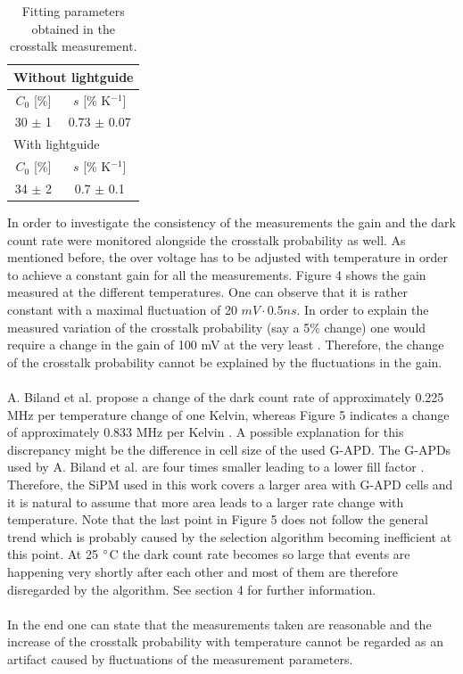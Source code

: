 \documentclass[10pt,a4paper]{article}
\begin{document}
\begin{table}[H]
\centering
\caption{Fitting parameters obtained in the crosstalk measurement.}
\begin{tabular}{|c|c|}
\hline 
 \multicolumn{2}{|l|}{Without lightguide} \\ 
\hline 
$C_0$ [\%] & $s$ [\% K$^{-1}$] \\ 
\hline 
30 $\pm$ 1 & 0.73 $\pm$ 0.07 \\ 
\hline 
 \multicolumn{2}{|l|}{With lightguide} \\ 
\hline 
$C_0$ [\%] & $s$ [\% K$^{-1}$] \\ 
\hline 
34 $\pm$ 2 & 0.7 $\pm$ 0.1 \\ 
\hline 
\end{tabular} 
\label{Table 4}
\end{table}
\begin{multicols}{2} \noindent
In order to investigate the consistency of the measurements the gain and the dark count rate were monitored alongside the crosstalk probability as well. As mentioned before, the over voltage has to be adjusted with temperature in order to achieve a constant gain for all the measurements. Figure 4 shows the gain measured at the different temperatures. One can observe that it is rather constant with a maximal fluctuation of 20 $mV \cdot 0.5ns$. In order to explain the measured variation of the crosstalk probability (say a 5\% change) one would require a change in the gain of 100 mV at the very least \cite{hamaref}. Therefore, the change of the crosstalk probability cannot be explained by the fluctuations in the gain. \\ \\ \noindent
A. Biland et al. propose a change of the dark count rate of approximately 0.225 MHz per temperature change of one Kelvin, whereas Figure 5 indicates a change of approximately 0.833 MHz per Kelvin \cite{gapd}. A possible explanation for this discrepancy might be the difference in cell size of the used G-APD. The G-APDs used by A. Biland et al. are four times smaller leading to a lower fill factor \cite{diode}. Therefore, the SiPM used in this work covers a larger area with G-APD cells and it is natural to assume that more area leads to a larger rate change with temperature. Note that the last point in Figure 5 does not follow the general trend which is probably caused by the selection algorithm becoming inefficient at this point. At 25 $\degree$C the dark count rate becomes so large that events are happening very shortly after each other and most of them are therefore disregarded by the algorithm. See section 4 for further information. \\ \\ \noindent
In the end one can state that the measurements taken are reasonable and the increase of the crosstalk probability with temperature cannot be regarded as an artifact caused by fluctuations of the measurement parameters.
\end{multicols}
\end{document}
